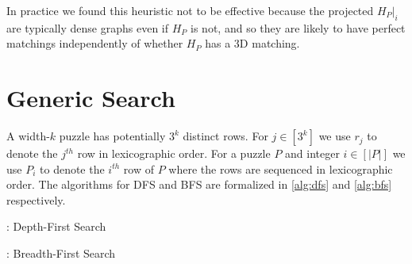 \documentclass[11pt]{article}
\begin{document}
In practice we found this heuristic not to be effective because the
projected $H_P|_i$ are typically dense graphs even if $H_P$ is not,
and so they are likely to have perfect matchings independently of
whether $H_P$ has a 3D matching.

\section{Generic Search}

\label{app:search}

A width-$k$ puzzle has potentially $3^k$ distinct rows.  For $j \in
[3^k]$ we use $r_j$ to denote the $j^{th}$ row in lexicographic order.
For a puzzle $P$ and integer $i \in [|P|]$ we use $P_i$ to denote the
$i^{th}$ row of $P$ where the rows are sequenced in lexicographic
order.  The algorithms for DFS and BFS are formalized in
\autoref{alg:dfs} and \autoref{alg:bfs} respectively.

\begin{algorithm}[h]
  \caption{: Depth-First Search}
  \label{alg:dfs}
\begin{algorithmic}[1]



    \EndIf
  \EndFor


  \EndFunction
\end{algorithmic}
\end{algorithm}

\begin{algorithm}[h]
  \caption{: Breadth-First Search}
  \label{alg:bfs}
\begin{algorithmic}[1]



      \EndIf
    \EndFor
  \EndWhile


  \EndFunction
\end{algorithmic}
\end{algorithm}
\end{document}
